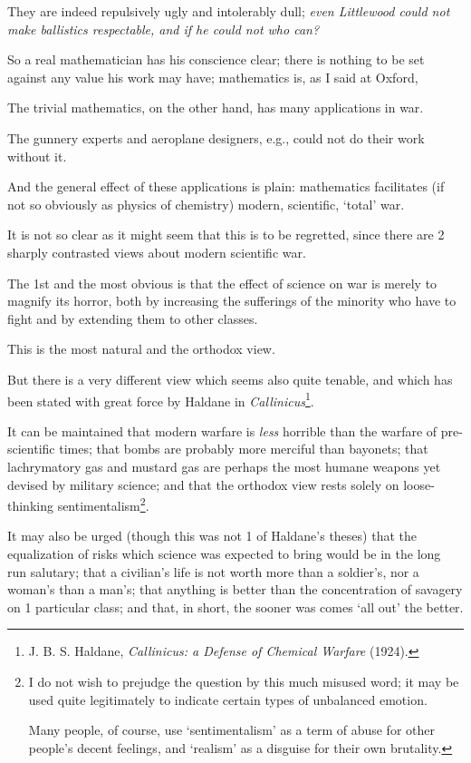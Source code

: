 \documentclass{article}
\numberwithin{equation}{section}
\begin{document}
They are indeed repulsively ugly and intolerably dull; \textit{even Littlewood could not make ballistics respectable, and if he could not who can?}

So a real mathematician has his conscience clear; there is nothing to be set against any value his work may have; mathematics is, as I said at Oxford, 

%
The trivial mathematics, on the other hand, has many applications in war.

The gunnery experts and aeroplane designers, e.g., could not do their work without it.

And the general effect of these applications is plain: mathematics facilitates (if not so obviously as physics of chemistry) modern, scientific, `total' war.

%
It is not so clear as it might seem that this is to be regretted, since there are 2 sharply contrasted views about modern scientific war.

The 1st and the most obvious is that the effect of science on war is merely to magnify its horror, both by increasing the sufferings of the minority who have to fight and by extending them to other classes.

This is the most natural and the orthodox view.

But there is a very different view which seems also quite tenable, and which has been stated with great force by Haldane in \textit{Callinicus}\footnote{J. B. S. Haldane, \textit{Callinicus: a Defense of Chemical Warfare} (1924).}.

It can be maintained that modern warfare is \textit{less} horrible than the warfare of pre-scientific times; that bombs are probably more merciful than bayonets; that lachrymatory gas and mustard gas are perhaps the most humane weapons yet devised by military science; and that the orthodox view rests solely on loose-thinking sentimentalism\footnote{I do not wish to prejudge the question by this much misused word; it may be used quite legitimately to indicate certain types of unbalanced emotion.

Many people, of course, use `sentimentalism' as a term of abuse for other people's decent feelings, and `realism' as a disguise for their own brutality.}.

It may also be urged (though this was not 1 of Haldane's theses) that the equalization of risks which science was expected to bring would be in the long run salutary; that a civilian's life is not worth more than a soldier's, nor a woman's than a man's; that anything is better than the concentration of savagery on 1 particular class; and that, in short, the sooner was comes `all out' the better.
\end{document}
